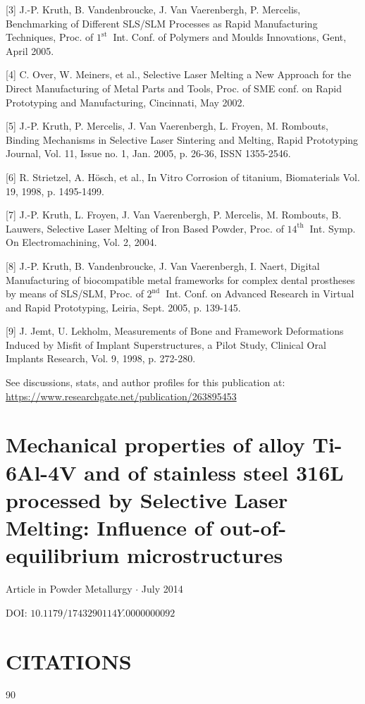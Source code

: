 \documentclass[10pt]{article}
\begin{document}
[3] J.-P. Kruth, B. Vandenbroucke, J. Van Vaerenbergh, P. Mercelis, Benchmarking of Different SLS/SLM Processes as Rapid Manufacturing Techniques, Proc. of $1^{\text {st }}$ Int. Conf. of Polymers and Moulds Innovations, Gent, April 2005.

[4] C. Over, W. Meiners, et al., Selective Laser Melting a New Approach for the Direct Manufacturing of Metal Parts and Tools, Proc. of SME conf. on Rapid Prototyping and Manufacturing, Cincinnati, May 2002.

[5] J.-P. Kruth, P. Mercelis, J. Van Vaerenbergh, L. Froyen, M. Rombouts, Binding Mechanisms in Selective Laser Sintering and Melting, Rapid Prototyping Journal, Vol. 11, Issue no. 1, Jan. 2005, p. 26-36, ISSN 1355-2546.

[6] R. Strietzel, A. Hösch, et al., In Vitro Corrosion of titanium, Biomaterials Vol. 19, 1998, p. 1495-1499.

[7] J.-P. Kruth, L. Froyen, J. Van Vaerenbergh, P. Mercelis, M. Rombouts, B. Lauwers, Selective Laser Melting of Iron Based Powder, Proc. of $14^{\text {th }}$ Int. Symp. On Electromachining, Vol. 2, 2004.

[8] J.-P. Kruth, B. Vandenbroucke, J. Van Vaerenbergh, I. Naert, Digital Manufacturing of biocompatible metal frameworks for complex dental prostheses by means of SLS/SLM, Proc. of $2^{\text {nd }}$ Int. Conf. on Advanced Research in Virtual and Rapid Prototyping, Leiria, Sept. 2005, p. 139-145.

[9] J. Jemt, U. Lekholm, Measurements of Bone and Framework Deformations Induced by Misfit of Implant Superstructures, a Pilot Study, Clinical Oral Implants Research, Vol. 9, 1998, p. 272-280.

See discussions, stats, and author profiles for this publication at: \href{https://www.researchgate.net/publication/263895453}{https://www.researchgate.net/publication/263895453}

\section*{Mechanical properties of alloy Ti-6Al-4V and of stainless steel 316L processed by Selective Laser Melting: Influence of out-of-equilibrium microstructures}
Article in Powder Metallurgy $\cdot$ July 2014

DOI: $10.1179 / 1743290114 Y .0000000092$

\section*{CITATIONS}
90
\end{document}
